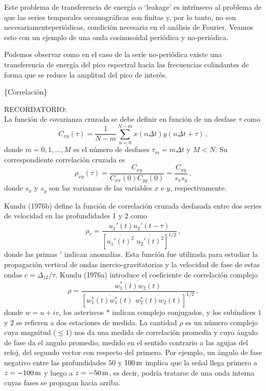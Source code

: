 \documentclass[
]{agujournal2019}
\begin{document}
Este problema de transferencia de energía o `leakage' es intrínseco al
problema de que las series temporales oceanográficas son finitas y, por
lo tanto, no son necesariamenteperiódicas, condición necesaria en el
análisis de Fourier. Veamos esto con un ejemplo de una onda cosinusoidal
periódica y no-periódica.

\begin{center}
\end{center}

Podemos observar como en el caso de la serie no-periódica existe una
transferencia de energía del pico espectral hacia las frecuencias
colindantes de forma que se reduce la amplitud del pico de interés.

\vspace{0.25cm}

\{\textbf \noindent Correlación\}

\begin{framed}
{\rm RECORDATORIO:}
\\
La función de covarianza cruzada se debe definir en función de un desfase $\tau$ como
 $$C_{xy}(\tau)=\frac{1}{N-m}\sum\limits^{N-m}_{n=0}x(n\Delta t) y(n\Delta t +\tau)\,,$$
donde $m=0,1,...,M$ es el número de desfases $\tau_m=m\Delta t$ y $M<N$.
Su correspondiente correlación cruzada es
  $${\rho}_{xy}(\tau)=\frac{C_{xy}}{C_{xx}(0)C_{yy}(0)}=\frac{C_{xy}}{s_{x}s_{y}}\,,$$
donde $s_x$ y $s_y$ son las varianzas de las variables $x$ e $y$, respectivamente.
\end{framed}

Kundu (1976b) define la función de correlación cruzada desfasada entre
dos series de velocidad en las profundidades 1 y 2 como
\[\rho_{\tau}=\frac{\overline{u_1'(t)u_2'(t-\tau)}}
{\left[ \overline{u_1'(t)^2}\,\, \overline{u_2'(t)^2} \right]^{1/2}}\,,\]
donde las primas \('\) indican anomalias. Esta función fue utilizada
para estudiar la propagación vertical de ondas inercio-gravitatorias y
la velocidad de fase de estas ondas \(c=\Delta_{12}/\tau\). Kundu
(1976a) introduce el coeficiente de correlación complejo
\[\rho=\frac{\overline{w_1^*(t)w_2(t)}}
{\left[ \overline{w_1^*(t)w_1^*(t)}\,\, \overline{w_2^*(t)w_2(t)} \right]^{1/2}}\,,\]
donde \(w=u+i v\), los asteriscos \(*\) indican complejo conjugados, y
los subíndices \(1\) y \(2\) se refieren a dos estaciones de medida. La
cantidad \(\rho\) es un número complejo cuya magnitud (\(\le1\)) nos da
una medida de correlación promedia y cuyo ángulo de fase da el angulo
promedio, medido en el sentido contrario a las agujas del reloj, del
segundo vector con respecto del primero. Por ejemplo, un ángulo de fase
negativo entre las profundidades \(50\) y \(100\,{\rm m}\) implica que
la señal llega primero a \(z=-100\,{\rm m}\) y luego a
\(z=-50\,{\rm m}\), es decir, podría tratarse de una onda interna cuyas
fases se propagan hacia arriba.
\end{document}
